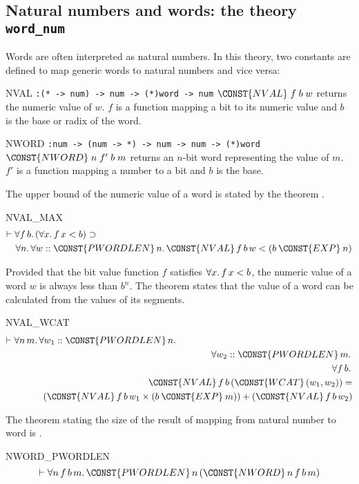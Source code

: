 \subsection{Natural numbers and words: the theory {\tt word\_num}}
\label{sec-word_num}
Words are often interpreted as natural numbers. In this theory, two
constants are defined to map generic words to natural numbers and vice versa:
\begin{center}
\begin{constants}
\item[NVAL] \verb":(* -> num) -> num -> (*)word -> num" \newline
        $\CONST{NVAL}\;f\;b\;w$ returns the numeric value of $w$.
        $f$ is a function mapping a bit to its numeric value and
        $b$ is the base or  radix of the word.
\item[NWORD] \verb":num -> (num -> *) -> num -> num -> (*)word"\newline
        $\CONST{NWORD}\;n\;f'\;b\;m$ returns an $n$-bit word representing
        the value of $m$. $f'$ is a function mapping a number to a bit and
        $b$ is the base.
\end{constants}
\end{center}
The upper bound of the numeric value of a word is stated by the
theorem .
\begin{holthm}{NVAL_MAX}
\begin{eqnarray*}
\lefteqn{\THM \FORALL f \,b\DOT
        (\FORALL x\DOT f \,x \LES  b) \IMP } \\
 & & \FORALL n\DOT \FORALL w :: \CONST{PWORDLEN} \,n\DOT
      \CONST{NVAL} \,f \,b \,w \LES ( b \:\CONST{EXP}\: n )
\end{eqnarray*}
\end{holthm}
Provided that the bit value function $f$ satisfies $\FORALL x\DOT f
\,x \LES  b$, the numeric value of a word $w$ is always less than
$b^n$. The theorem  states that the
value of a word can be calculated from the values of its segments.
\begin{holthm}{NVAL_WCAT}
\begin{eqnarray*}
\lefteqn{\THM \FORALL n\,m \DOT \FORALL w_1 :: \CONST{PWORDLEN} \,n\DOT} \\
 & & {} \FORALL w_2 :: \CONST{PWORDLEN} \,m\DOT \\
 & & \quad \FORALL f \,b\DOT\\
 & & \qquad \CONST{NVAL} \,f \,b \,(\CONST{WCAT} \,(w_{1},w_{2})) =\\
 & & \qquad \quad (\CONST{NVAL} \,f \,b \,w_{1} \MUL
                                 ( b \:\CONST{EXP}\: m )) +
                                 (\CONST{NVAL} \,f \,b \,w_{2})
\end{eqnarray*}
\end{holthm}
The theorem stating the size of the result of mapping from natural
number to word is .
\begin{holthm}{NWORD_PWORDLEN}
\[\THM \FORALL n \,f \,b \,m\DOT
        \CONST{PWORDLEN}\,n \,(\CONST{NWORD} \,n \,f \,b \,m)
\]
\end{holthm}

